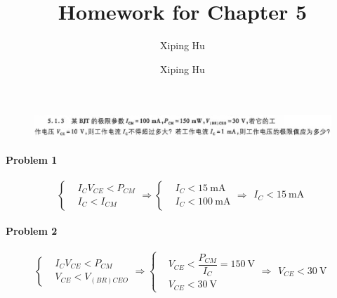 \documentclass{article}
\author{Xiping Hu}
\author{Xiping Hu}
\affil{https://hxp.plus/}
\title{Homework for Chapter 5}
\begin{document}
\maketitle

\begin{figure}[H]
  \centering
  \includegraphics[width=\linewidth]{figures/Problem513}
  \label{fig:}
\end{figure}

\paragraph{Problem 1}

\begin{equation*}
  \left\{
    \begin{aligned}
      & I_C V_{CE} < P_{CM} \\
      & I_C < I_{CM} 
    \end{aligned}
  \right.
  \Rightarrow
  \left\{
    \begin{aligned}
      & I_C < 15 \  \mathrm{mA} \\
      & I_C < 100 \  \mathrm{mA}
    \end{aligned}
  \right.
\Rightarrow
  \begin{aligned}
    I_{C} < 15 \  \mathrm{mA}
  \end{aligned}
\end{equation*}

\paragraph{Problem 2}

\begin{equation*}
  \left\{
  \begin{aligned}
    & I_C V_{CE} < P_{CM} \\
    & V_{CE} < V_{\left( BR \right)CEO} 
  \end{aligned}
  \right.
\Rightarrow
  \left\{
  \begin{aligned}
    & V_{CE} < \dfrac{P_{CM}}{I_C} =  150 \  \mathrm{V} \\
    & V_{CE} < 30 \  \mathrm{V}
  \end{aligned}
  \right.
\Rightarrow
  \begin{aligned}
    V_{CE} < 30 \  \mathrm{V}
  \end{aligned}
\end{equation*}
\end{document}
